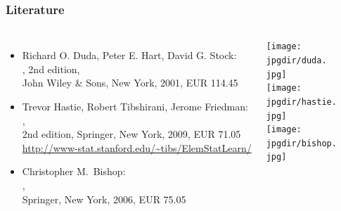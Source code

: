    \begin{frame}
      \frametitle{Literature}

      \begin{columns}

         \small
         \vspace{-1.25cm}
         \begin{itemize}
            \item Richard O. Duda, Peter E. Hart, David G. Stock: \\
              , 2nd edition, \\
              John Wiley \& Sons, New York, 2001, EUR 114.45 \\[.5cm]

            \item Trevor Hastie, Robert Tibshirani, Jerome Friedman: \\
              , \\
              2nd edition, Springer, New York, 2009, EUR 71.05 \\
              {\small \url{http://www-stat.stanford.edu/~tibs/ElemStatLearn/}} \\[.5cm]

            \item Christopher M.\ Bishop: \\
              , \\
              Springer, New York, 2006, EUR 75.05
         \end{itemize}

         \texttt{[image: \\jpgdir/duda.\\jpg]} \\[.5cm]
         \texttt{[image: \\jpgdir/hastie.\\jpg]} \\[.4cm]
         \texttt{[image: \\jpgdir/bishop.\\jpg]}
      \end{columns}
   \end{frame}


